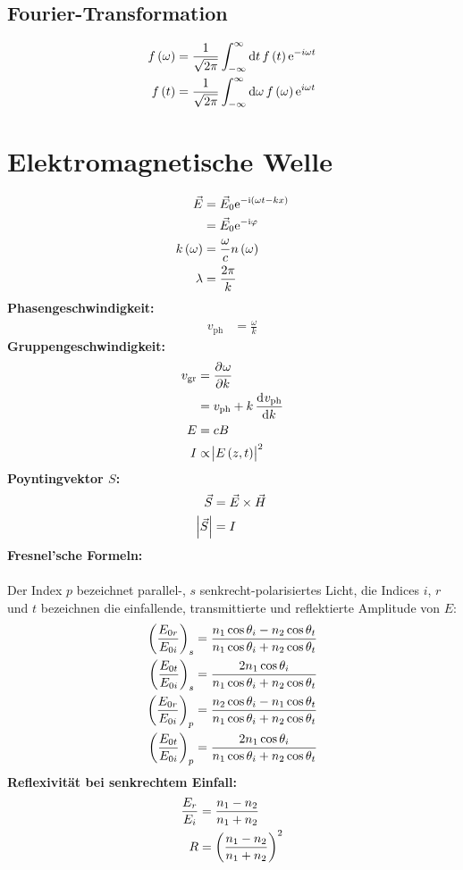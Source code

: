 		\subsection{Fourier-Transformation}
			\begin{align*}
				f\del{\omega}&=\frac{1}{\sqrt{2\pi}}\int_{-\infty}^\infty\dif t \, f\del{t}\exp{-i\omega t}\\
				f\del{t}&=\frac{1}{\sqrt{2\pi}}\int_{-\infty}^\infty\dif \omega  \, f\del{\omega}\exp{i\omega t}
			\end{align*}

	\section{Elektromagnetische Welle}
		\begin{align*}
			\vec E&=\vec E_0\exp{-\i\del{\omega t-kx}}\\
			&=\vec E_0\exp{-\i\varphi}\\
			k\del\omega&=\frac{\omega}{c}n\del\omega\\
			\lambda&=\frac{2\pi}{k}
		\end{align*}
		\textbf{Phasengeschwindigkeit:}
		\begin{align*}
			v_{\text{ph}}&=\frac{\omega}{k}
		\end{align*}
		\textbf{Gruppengeschwindigkeit:}
		\begin{align*}
			v_{\text{gr}}&=\dpd{\omega}k\\
			&=v_{\text{ph}}+k\dod{v_{\text{ph}}}k\\
			E&=cB\\
			I&\propto\abs{E\del{z,t}}^2
		\end{align*}
		\textbf{Poyntingvektor $S$:}
		\begin{align*}
			\vec S&=\vec E\times \vec H\\
			\abs{\vec S}&=I
		\end{align*}
		\textbf{Fresnel'sche Formeln:} \\
		\hfill \\
		Der Index $p$ bezeichnet parallel-, $s$ senkrecht-polarisiertes Licht, die Indices $i$, $r$ und $t$ bezeichnen die einfallende, transmittierte und reflektierte Amplitude von $E$:
		\begin{align*}
			\del{\frac{E_{0r}}{E_{0i}}}_s &=\frac{n_1\cos\theta_i-n_2\cos\theta_t}{n_1\cos\theta_i+n_2\cos\theta_t}\\
			\del{\frac{E_{0t}}{E_{0i}}}_s &=\frac{2n_1\cos\theta_i}{n_1\cos\theta_i+n_2\cos\theta_t}\\
			\del{\frac{E_{0r}}{E_{0i}}}_p &=\frac{n_2\cos\theta_i-n_1\cos\theta_t}{n_1\cos\theta_i+n_2\cos\theta_t}\\
			\del{\frac{E_{0t}}{E_{0i}}}_p &=\frac{2n_1\cos\theta_i}{n_1\cos\theta_i+n_2\cos\theta_t}
			\end{align*}
		\textbf{Reflexivität bei senkrechtem Einfall:}
		\begin{align*}
			\frac{E_r}{E_i}&=\frac{n_1-n_2}{n_1+n_2}\\
			R&=\del{\frac{n_1-n_2}{n_1+n_2}}^2
		\end{align*}

